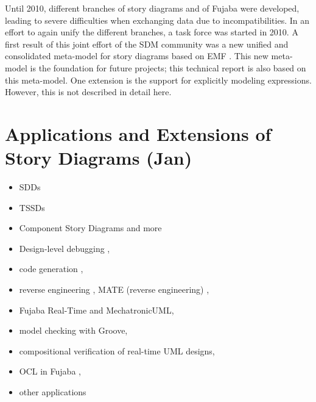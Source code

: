 Until 2010, different branches of story diagrams and of Fujaba were developed, leading to severe difficulties when exchanging data due to incompatibilities.
In an effort to again unify the different branches, a task force was started in 2010.
A first result of this joint effort of the SDM community was a new unified and consolidated meta-model for story diagrams based on EMF \cite{HRvD+11}.
This new meta-model is the foundation for future projects; this technical report is also based on this meta-model.
One extension is the support for explicitly modeling expressions.
However, this is not described in detail here.













\section{Applications and Extensions of Story Diagrams (Jan)}

\begin{itemize}
\item SDDs \cite{GK06a}
\item TSSDs \cite{KG07a}
\item Component Story Diagrams and more \cite{THH+08}
\item Design-level debugging \cite{GZ02,Gei02,GZ06},
\item code generation \cite{GSR05,GBD07},
\item reverse engineering \cite{NSW+02,BGS+Z08}, MATE (reverse engineering) \cite{SKS+07,ST08},
\item Fujaba Real-Time and MechatronicUML,
\item model checking with Groove,
\item compositional verification of real-time UML designs,
\item OCL in Fujaba \cite{SZG07},
\item other applications \cite{KNNZ00,GZ10}
\end{itemize}


